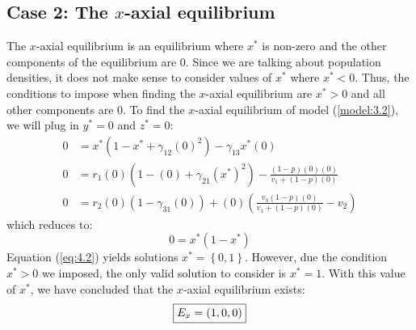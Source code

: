 \subsection{Case 2: The $x$-axial equilibrium}\label{subsec:x_axial_equilibrium}
The $x$-axial equilibrium is an equilibrium where $x^*$ is non-zero and the other components of the equilibrium are 0. Since we are talking about population densities, it does not make sense to consider values of $x^*$ where $x^*<0$. Thus, the conditions to impose when finding the $x$-axial equilibrium are $x^*>0$ and all other components are 0. To find the $x$-axial equilibrium of model (\ref{model:3.2}), we will plug in $y^*=0$ and $z^*=0$:
\begin{align*}
    0 &= x^*\left(1-x^*+\gamma_{12}(0)^2\right)-\gamma_{13}x^*(0)\\
    0 &= r_1(0)\left(1-(0)+\gamma_{21}\left(x^*\right)^2\right)-\frac{\left(1-p\right)(0)(0)}{v_1+\left(1-p\right)(0)}\\
    0 &= r_2(0)\left(1-\gamma_{31}(0)\right)+(0)\left(\frac{v_3\left(1-p\right)(0)}{v_1+\left(1-p\right)(0)}-v_2\right)
\end{align*}
which reduces to:
\begin{equation}
    0 = x^*\left(1-x^*\right)
    \label{eq:4.2}
\end{equation}
Equation (\ref{eq:4.2}) yields solutions $x^*=\left\{0, 1\right\}$. However, due the condition $x^*>0$ we imposed, the only valid solution to consider is $x^*=1$. With this value of $x^*$, we have concluded that the $x$-axial equilibrium exists:
\[
\fbox{$\displaystyle E_x=\left(
1,
0,
0
\right)$}
\]


